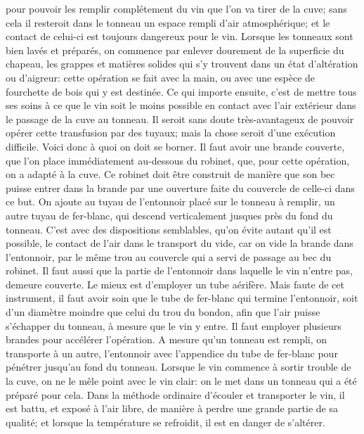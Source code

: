 pour pouvoir les remplir complétement du vin que l'on va tirer de la cuve; sans cela il resteroit dans le tonneau un espace rempli d'air atmosphérique; et le contact de celui-ci est toujours dangereux pour le vin.
Lorsque les tonneaux sont bien lavés et préparés, on commence par enlever dourement de la superficie du chapeau, les grappes et matières solides qui s'y trouvent dans un état d'altération ou d'aigreur: cette opération se fait avec la main, ou avec une espèce de fourchette de bois qui y est destinée.
Ce qui importe ensuite, c'est de mettre tous ses soins à ce que le vin soit le moins possible en contact avec l'air extérieur dans le passage de la cuve au tonneau. Il seroit sans doute très-avantageux de pouvoir opérer cette transfusion par des tuyaux; mais la chose seroit d'une exécution difficile. Voici donc à quoi on doit se borner. Il faut avoir une brande couverte, que l'on place immédiatement au-dessous du robinet, que, pour cette opération, on a adapté à la cuve. Ce robinet doit être construit de manière que son bec puisse entrer dans la brande par une ouverture faite du couvercle de celle-ci dans ce but.\setcounter{page}{155} On ajoute au tuyau de l'entonnoir placé sur le tonneau à remplir, un autre tuyau de fer-blanc, qui descend verticalement jusques près du fond du tonneau. C'est avec des dispositions semblables, qu'on évite autant qu'il est possible, le contact de l'air dans le transport du vide, car on vide la brande dans l'entonnoir, par le même trou au couvercle qui a servi de passage au bec du robinet.
Il faut aussi que la partie de l'entonnoir dans laquelle le vin n'entre pas, demeure couverte. Le mieux est d'employer un tube aérifère. Mais faute de cet instrument, il faut avoir soin que le tube de fer-blanc qui termine l'entonnoir, soit d'un diamètre moindre que celui du trou du bondon, afin que l'air puisse s'échapper du tonneau, à mesure que le vin y entre.
Il faut employer plusieurs brandes pour accélérer l'opération. A mesure qu'un tonneau est rempli, on transporte à un autre, l'entonnoir avec l'appendice du tube de fer-blanc pour pénétrer jusqu'au fond du tonneau.
Lorsque le vin commence à sortir trouble de la cuve, on ne le mêle point avec le vin clair: on le met dans un tonneau qui a été préparé pour cela.\setcounter{page}{156} Dans la méthode ordinaire d'écouler et transporter le vin, il est battu, et exposé à l'air libre, de manière à perdre une grande partie de sa qualité; et lorsque la température se refroidit, il est en danger de s'altérer.
